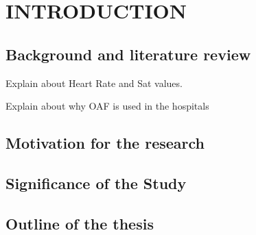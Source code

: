 \section{INTRODUCTION} \label{sec:itroduction}

\subsection{Background and literature review}

Explain about Heart Rate and Sat values. 

Explain about why OAF is used in the hospitals


\subsection{Motivation for the research}

\subsection{Significance of the Study}


\subsection{Outline of the thesis}



